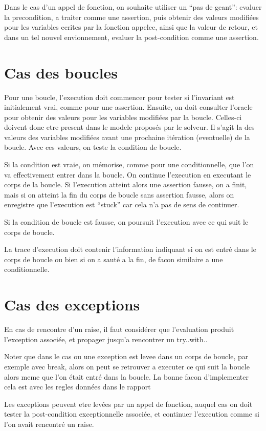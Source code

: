 \documentclass[a4paper,twoside]{article}
\begin{document}
Dans le cas d'un appel de fonction, on souhaite utiliser un ``pas de geant'':
evaluer la precondition, a traiter comme une assertion, puis obtenir des valeurs
modifiées pour les variables ecrites par la fonction appelee, ainsi que la
valeur de retour, et dans un tel nouvel envionnement, evaluer la post-condition
comme une assertion.

\section{Cas des boucles}

Pour une boucle, l'execution doit commencer pour tester si l'invariant est
initialement vrai, comme pour une assertion. Ensuite, on doit consulter l'oracle
pour obtenir des valeurs pour les variables modifiées par la boucle. Celles-ci
doivent donc etre present dans le modele proposés par le solveur. Il s'agit la
des valeurs des variables modifiées avant une prochaine itération (eventuelle) de
la boucle. Avec ces valeurs, on teste la condition de boucle.

Si la condition est vraie, on mémorise, comme pour une conditionnelle, que l'on
va effectivement entrer dans la boucle. On continue l'execution en executant le
corps de la boucle. Si l'execution atteint alors une assertion fausse, on a
finit, mais si on atteint la fin du corps de boucle sans assertion fausse, alors
on enregistre que l'execution est ``stuck'' car cela n'a pas de sens de
continuer.

Si la condition de boucle est fausse, on poursuit l'execution avec ce qui suit
le corps de boucle.

La trace d'execution doit contenir l'information indiquant si on est entré dans
le corps de boucle ou bien si on a sauté a la fin, de facon similaire a une
conditionnelle.


\section{Cas des exceptions}

En cas de rencontre d'un raise, il faut considérer que l'evaluation produit
l'exception associée, et propager jusqu'a rencontrer un try..with..

Noter que dans le cas ou une exception est levee dans un corps de boucle, par
exemple avec break, alors on peut se retrouver a executer ce qui suit la boucle
alors meme que l'on était entré dans la boucle. La bonne facon d'implementer
cela est avec les regles données dans le rapport~\cite{becker21rr}

Les exceptions peuvent etre levées par un appel de fonction, auquel cas on doit
tester la post-condition exceptionnelle associée, et continuer l'execution comme
si l'on avait rencontré un raise.




%

\end{document}
